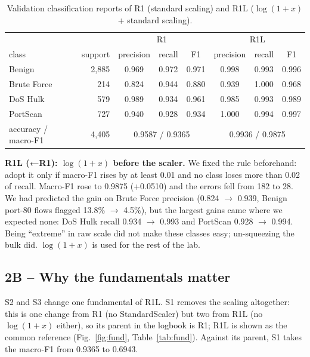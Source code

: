 \documentclass[9pt]{extarticle}
\newcommand{\run}[1]{\textsf{#1}}
\begin{document}
\begin{table}[h]
\centering\small
\begin{tabular}{lrcccccc}
\toprule
 & & \multicolumn{3}{c}{\run{R1}} & \multicolumn{3}{c}{\run{R1L}} \\
class & support & precision & recall & F1 & precision & recall & F1 \\
\midrule
Benign & 2,885 & 0.969 & 0.972 & 0.971 & 0.998 & 0.993 & 0.996 \\
Brute Force & 214 & 0.824 & 0.944 & 0.880 & 0.939 & 1.000 & 0.968 \\
DoS Hulk & 579 & 0.989 & 0.934 & 0.961 & 0.985 & 0.993 & 0.989 \\
PortScan & 727 & 0.940 & 0.928 & 0.934 & 1.000 & 0.994 & 0.997 \\
\midrule
accuracy / macro-F1 & 4,405 & \multicolumn{3}{c}{0.9587 / 0.9365} & \multicolumn{3}{c}{0.9936 / 0.9875} \\
\bottomrule
\end{tabular}
\caption{Validation classification reports of \run{R1} (standard scaling) and \run{R1L} ($\log(1+x)$ + standard scaling).}
\label{tab:r1}
\end{table}

\textbf{\run{R1L (←R1)}: $\log(1+x)$ before the scaler.} We fixed the rule beforehand: adopt it only if macro-F1 rises by at least 0.01 and no class loses more than 0.02 of recall. Macro-F1 rose to 0.9875 (+0.0510) and the errors fell from 182 to 28. We had predicted the gain on Brute Force precision (0.824 $\rightarrow$ 0.939, Benign port-80 flows flagged 13.8\% $\rightarrow$ 4.5\%), but the largest gains came where we expected none: DoS Hulk recall 0.934 $\rightarrow$ 0.993 and PortScan 0.928 $\rightarrow$ 0.994. Being ``extreme'' in raw scale did not make these classes easy; un-squeezing the bulk did. $\log(1+x)$ is used for the rest of the lab.

\subsection*{2B -- Why the fundamentals matter}
\run{S2} and \run{S3} change one fundamental of \run{R1L}. \run{S1} removes the scaling altogether: this is one change from \run{R1} (no StandardScaler) but two from \run{R1L} (no $\log(1+x)$ either), so its parent in the logbook is \run{R1}; \run{R1L} is shown as the common reference (Fig.~\ref{fig:fund}, Table~\ref{tab:fund}). Against its parent, \run{S1} takes the macro-F1 from 0.9365 to 0.6943.
\end{document}

